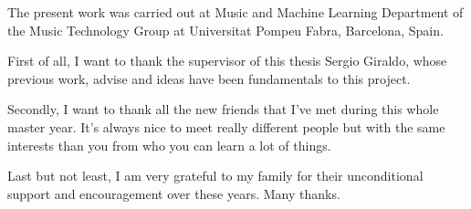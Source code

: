 
\begin{acknowledgement}

The present work was carried out at Music and Machine Learning Department of the Music Technology Group at Universitat Pompeu Fabra, Barcelona, Spain.

First of all, I want to thank the supervisor of this thesis Sergio Giraldo, whose previous work, advise and ideas have been fundamentals to this project.

Secondly, I want to thank all the new friends that I've met during this whole master year. It's always nice to meet really different people but with the same interests than you from who you can learn a lot of things.

Last  but  not  least, I  am  very grateful to  my  family for their unconditional support and encouragement over these years. Many thanks.

\newpage
\end{acknowledgement}